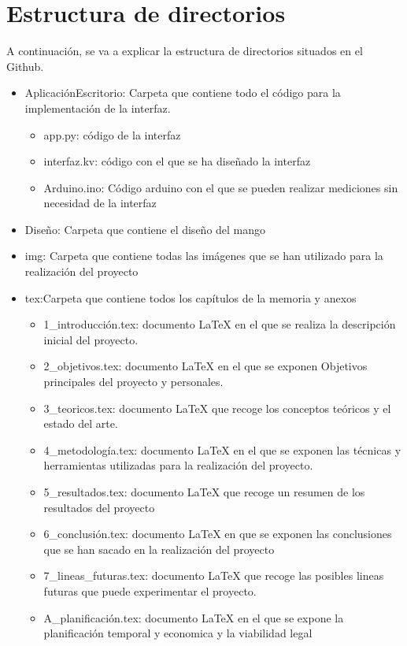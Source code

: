 \section{Estructura de directorios}
A continuación, se va a explicar la estructura de directorios situados en el Github.
\begin{itemize}
    \item AplicaciónEscritorio: Carpeta que contiene todo el código para la implementación de la interfaz.
    \begin{itemize}
        \item app.py: código de la interfaz
        \item interfaz.kv: código con el que se ha diseñado la interfaz
        \item Arduino.ino: Código arduino con el que se pueden realizar mediciones sin necesidad de la interfaz
    \end{itemize}
    \item Diseño: Carpeta que contiene el diseño del mango
    \item img: Carpeta que contiene todas las imágenes que se han utilizado para la realización del proyecto 
    \item tex:Carpeta que contiene todos los capítulos de la memoria y anexos
    \begin{itemize}
        \item 1\_introducción.tex: documento LaTeX en el que se realiza la descripción inicial del proyecto.
        \item 2\_objetivos.tex: documento LaTeX en el que se exponen  Objetivos principales del proyecto y personales.
        \item 3\_teoricos.tex: documento LaTeX que recoge los conceptos teóricos y el estado del arte.
        \item 4\_metodología.tex: documento LaTeX en el que se exponen las técnicas y herramientas utilizadas para la realización del proyecto.
        \item 5\_resultados.tex: documento LaTeX que recoge un resumen de los resultados del proyecto
        \item 6\_conclusión.tex: documento LaTeX en que se exponen las conclusiones que se han sacado en la realización del proyecto
        \item 7\_lineas\_futuras.tex: documento LaTeX que recoge las posibles lineas futuras que puede experimentar el proyecto.
        \item A\_planificación.tex: documento LaTeX en el que se expone la planificación temporal y economica y la viabilidad legal

\end{itemize}
\end{itemize}
